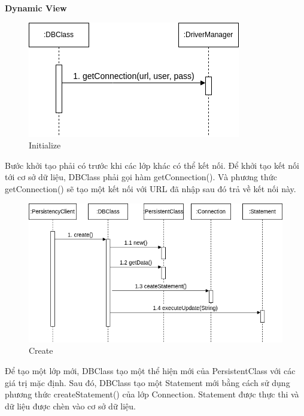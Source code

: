 \textbf{Dynamic View}
\begin{figure}[H]
    \centering
    \includegraphics[width=0.75\linewidth]{img3.1.2/design mechanism-Initialize.drawio.png}
    \caption{Initialize}
\end{figure}
Bước khởi tạo phải có trước khi các lớp khác có thể kết nối. Để khởi tạo kết nối tới cơ sở dữ liệu, DBClass phải gọi hàm getConnection(). Và phương thức getConnection() sẽ tạo một kết nối với URL đã nhập sau đó trả về kết nối này.

\begin{figure}[H]
    \centering
    \includegraphics[width=\linewidth]{img3.1.2/design mechanism-Create.drawio.png}
    \caption{Create}
\end{figure}
Để tạo một lớp mới, DBClass tạo một thể hiện mới của PersistentClass với các giá trị mặc định. Sau đó, DBClass tạo một Statement mới bằng cách sử dụng phương thức createStatement() của lớp Connection. Statement được thực thi và dữ liệu được chèn vào cơ sở dữ liệu.

